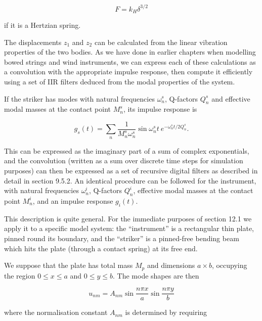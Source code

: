   \begin{equation*}F=k_H\delta^{3/2} \tag{4}\end{equation*} 

  \noindent{}if it is a Hertzian spring. 

  The displacements $z_1$ and $z_2$ can be calculated from the linear vibration 
  properties of the two bodies. As we have done in earlier chapters when 
  modelling bowed strings and wind instruments, we can express each of these 
  calculations as a convolution with the appropriate impulse response, then 
  compute it efficiently using a set of IIR filters deduced from the modal 
  properties of the system. 

  If the striker has modes with natural frequencies $\omega_n^s$, Q-factors 
  $Q_n^s$ and effective modal masses at the contact point $M_n^s$, its impulse 
  response is 

  \begin{equation*}g_s(t)=\sum_n{\dfrac{1}{M_n^s \omega_n^s} \sin \omega_n^s 
  t~e^{-\omega_n^s t/2 Q_n^s}}. \tag{5}\end{equation*} 

  This can be expressed as the imaginary part of a sum of complex exponentials, 
  and the convolution (written as a sum over discrete time steps for simulation 
  purposes) can then be expressed as a set of recursive digital filters as 
  described in detail in section 9.5.2. An identical procedure can be followed 
  for the instrument, with natural frequencies $\omega_n^i$, Q-factors $Q_n^i$, 
  effective modal masses at the contact point $M_n^i$, and an impulse response 
  $g_i(t)$. 

  This description is quite general. For the immediate purposes of section 12.1 
  we apply it to a specific model system: the ``instrument'' is a rectangular 
  thin plate, pinned round its boundary, and the ``striker'' is a pinned-free 
  bending beam which hits the plate (through a contact spring) at its free end. 

  We suppose that the plate has total mass $M_p$ and dimensions $a \times b$, 
  occupying the region $0 \le x \le a$ and $0 \le y \le b$. The mode shapes are 
  then 

  \begin{equation*}u_{nm}=A_{nm} \sin \dfrac{n \pi x}{a} \sin \dfrac{n \pi 
  y}{b} \tag{6}\end{equation*} 

  \noindent{}where the normalisation constant $A_{nm}$ is determined by 
  requiring 

